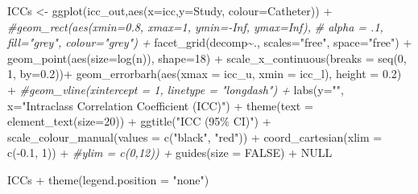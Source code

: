\documentclass[
]{article}
\newenvironment{Shaded}{\begin{snugshade}}{\end{snugshade}}
\newcommand{\AttributeTok}[1]{\textcolor[rgb]{0.77,0.63,0.00}{#1}}
\newcommand{\CommentTok}[1]{\textcolor[rgb]{0.56,0.35,0.01}{\textit{#1}}}
\newcommand{\ConstantTok}[1]{\textcolor[rgb]{0.00,0.00,0.00}{#1}}
\newcommand{\DecValTok}[1]{\textcolor[rgb]{0.00,0.00,0.81}{#1}}
\newcommand{\FloatTok}[1]{\textcolor[rgb]{0.00,0.00,0.81}{#1}}
\newcommand{\FunctionTok}[1]{\textcolor[rgb]{0.00,0.00,0.00}{#1}}
\newcommand{\NormalTok}[1]{#1}
\newcommand{\OtherTok}[1]{\textcolor[rgb]{0.56,0.35,0.01}{#1}}
\newcommand{\SpecialCharTok}[1]{\textcolor[rgb]{0.00,0.00,0.00}{#1}}
\newcommand{\StringTok}[1]{\textcolor[rgb]{0.31,0.60,0.02}{#1}}
\begin{document}
\begin{Shaded}
\begin{Highlighting}[]
\NormalTok{ICCs }\OtherTok{\textless{}{-}} \FunctionTok{ggplot}\NormalTok{(icc\_out,}\FunctionTok{aes}\NormalTok{(}\AttributeTok{x=}\NormalTok{icc,}\AttributeTok{y=}\NormalTok{Study, }
                           \AttributeTok{colour=}\NormalTok{Catheter)) }\SpecialCharTok{+}
  \CommentTok{\#geom\_rect(aes(xmin=0.8, xmax=1, ymin={-}Inf, ymax=Inf),}
  \CommentTok{\#          alpha = .1, fill="grey", colour="grey") +}
  \FunctionTok{facet\_grid}\NormalTok{(decomp}\SpecialCharTok{\textasciitilde{}}\NormalTok{., }\AttributeTok{scales=}\StringTok{"free"}\NormalTok{, }\AttributeTok{space=}\StringTok{"free"}\NormalTok{) }\SpecialCharTok{+}
  \FunctionTok{geom\_point}\NormalTok{(}\FunctionTok{aes}\NormalTok{(}\AttributeTok{size=}\FunctionTok{log}\NormalTok{(n)), }\AttributeTok{shape=}\DecValTok{18}\NormalTok{) }\SpecialCharTok{+} 
  \FunctionTok{scale\_x\_continuous}\NormalTok{(}\AttributeTok{breaks =} \FunctionTok{seq}\NormalTok{(}\DecValTok{0}\NormalTok{, }\DecValTok{1}\NormalTok{, }\AttributeTok{by=}\FloatTok{0.2}\NormalTok{))}\SpecialCharTok{+}
  \FunctionTok{geom\_errorbarh}\NormalTok{(}\FunctionTok{aes}\NormalTok{(}\AttributeTok{xmax =}\NormalTok{ icc\_u, }\AttributeTok{xmin =}\NormalTok{ icc\_l), }\AttributeTok{height =} \FloatTok{0.2}\NormalTok{) }\SpecialCharTok{+}
  \CommentTok{\#geom\_vline(xintercept = 1, linetype = "longdash") +}
  \FunctionTok{labs}\NormalTok{(}\AttributeTok{y=}\StringTok{""}\NormalTok{, }\AttributeTok{x=}\StringTok{"Intraclass Correlation Coefficient (ICC)"}\NormalTok{) }\SpecialCharTok{+}
  \FunctionTok{theme}\NormalTok{(}\AttributeTok{text =} \FunctionTok{element\_text}\NormalTok{(}\AttributeTok{size=}\DecValTok{20}\NormalTok{)) }\SpecialCharTok{+}
  \FunctionTok{ggtitle}\NormalTok{(}\StringTok{"ICC (95\% CI)"}\NormalTok{) }\SpecialCharTok{+}
  \FunctionTok{scale\_colour\_manual}\NormalTok{(}\AttributeTok{values =} \FunctionTok{c}\NormalTok{(}\StringTok{"black"}\NormalTok{, }\StringTok{"red"}\NormalTok{)) }\SpecialCharTok{+}
  \FunctionTok{coord\_cartesian}\NormalTok{(}\AttributeTok{xlim =} \FunctionTok{c}\NormalTok{(}\SpecialCharTok{{-}}\FloatTok{0.1}\NormalTok{, }\DecValTok{1}\NormalTok{)) }\SpecialCharTok{+}
                  \CommentTok{\#ylim = c(0,12)) +}
  \FunctionTok{guides}\NormalTok{(}\AttributeTok{size =} \ConstantTok{FALSE}\NormalTok{) }\SpecialCharTok{+}
  \ConstantTok{NULL}

\NormalTok{ICCs }\SpecialCharTok{+} \FunctionTok{theme}\NormalTok{(}\AttributeTok{legend.position =} \StringTok{"none"}\NormalTok{)}
\end{Highlighting}
\end{Shaded}
\end{document}
